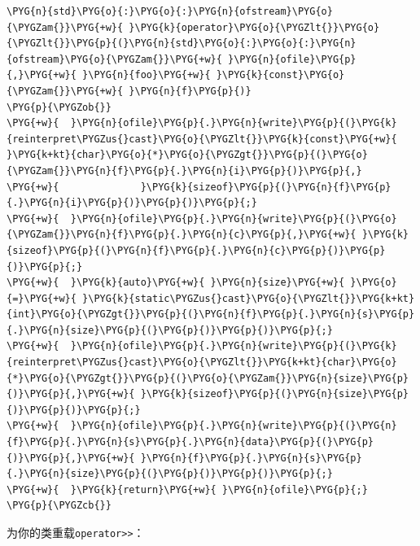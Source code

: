 \begin{codeblockbg}
\begin{Verbatim}[commandchars=\\\{\},breaklines=true,breakanywhere=true,fontsize=\codefont,xleftmargin=17bp]
\PYG{n}{std}\PYG{o}{:}\PYG{o}{:}\PYG{n}{ofstream}\PYG{o}{\PYGZam{}}\PYG{+w}{ }\PYG{k}{operator}\PYG{o}{\PYGZlt{}}\PYG{o}{\PYGZlt{}}\PYG{p}{(}\PYG{n}{std}\PYG{o}{:}\PYG{o}{:}\PYG{n}{ofstream}\PYG{o}{\PYGZam{}}\PYG{+w}{ }\PYG{n}{ofile}\PYG{p}{,}\PYG{+w}{ }\PYG{n}{foo}\PYG{+w}{ }\PYG{k}{const}\PYG{o}{\PYGZam{}}\PYG{+w}{ }\PYG{n}{f}\PYG{p}{)}
\PYG{p}{\PYGZob{}}
\PYG{+w}{  }\PYG{n}{ofile}\PYG{p}{.}\PYG{n}{write}\PYG{p}{(}\PYG{k}{reinterpret\PYGZus{}cast}\PYG{o}{\PYGZlt{}}\PYG{k}{const}\PYG{+w}{ }\PYG{k+kt}{char}\PYG{o}{*}\PYG{o}{\PYGZgt{}}\PYG{p}{(}\PYG{o}{\PYGZam{}}\PYG{n}{f}\PYG{p}{.}\PYG{n}{i}\PYG{p}{)}\PYG{p}{,}
\PYG{+w}{              }\PYG{k}{sizeof}\PYG{p}{(}\PYG{n}{f}\PYG{p}{.}\PYG{n}{i}\PYG{p}{)}\PYG{p}{)}\PYG{p}{;}
\PYG{+w}{  }\PYG{n}{ofile}\PYG{p}{.}\PYG{n}{write}\PYG{p}{(}\PYG{o}{\PYGZam{}}\PYG{n}{f}\PYG{p}{.}\PYG{n}{c}\PYG{p}{,}\PYG{+w}{ }\PYG{k}{sizeof}\PYG{p}{(}\PYG{n}{f}\PYG{p}{.}\PYG{n}{c}\PYG{p}{)}\PYG{p}{)}\PYG{p}{;}
\PYG{+w}{  }\PYG{k}{auto}\PYG{+w}{ }\PYG{n}{size}\PYG{+w}{ }\PYG{o}{=}\PYG{+w}{ }\PYG{k}{static\PYGZus{}cast}\PYG{o}{\PYGZlt{}}\PYG{k+kt}{int}\PYG{o}{\PYGZgt{}}\PYG{p}{(}\PYG{n}{f}\PYG{p}{.}\PYG{n}{s}\PYG{p}{.}\PYG{n}{size}\PYG{p}{(}\PYG{p}{)}\PYG{p}{)}\PYG{p}{;}
\PYG{+w}{  }\PYG{n}{ofile}\PYG{p}{.}\PYG{n}{write}\PYG{p}{(}\PYG{k}{reinterpret\PYGZus{}cast}\PYG{o}{\PYGZlt{}}\PYG{k+kt}{char}\PYG{o}{*}\PYG{o}{\PYGZgt{}}\PYG{p}{(}\PYG{o}{\PYGZam{}}\PYG{n}{size}\PYG{p}{)}\PYG{p}{,}\PYG{+w}{ }\PYG{k}{sizeof}\PYG{p}{(}\PYG{n}{size}\PYG{p}{)}\PYG{p}{)}\PYG{p}{;}
\PYG{+w}{  }\PYG{n}{ofile}\PYG{p}{.}\PYG{n}{write}\PYG{p}{(}\PYG{n}{f}\PYG{p}{.}\PYG{n}{s}\PYG{p}{.}\PYG{n}{data}\PYG{p}{(}\PYG{p}{)}\PYG{p}{,}\PYG{+w}{ }\PYG{n}{f}\PYG{p}{.}\PYG{n}{s}\PYG{p}{.}\PYG{n}{size}\PYG{p}{(}\PYG{p}{)}\PYG{p}{)}\PYG{p}{;}
\PYG{+w}{  }\PYG{k}{return}\PYG{+w}{ }\PYG{n}{ofile}\PYG{p}{;}
\PYG{p}{\PYGZcb{}}
\end{Verbatim}
\end{codeblockbg}



为你的类重载\texttt{operator>>}：



